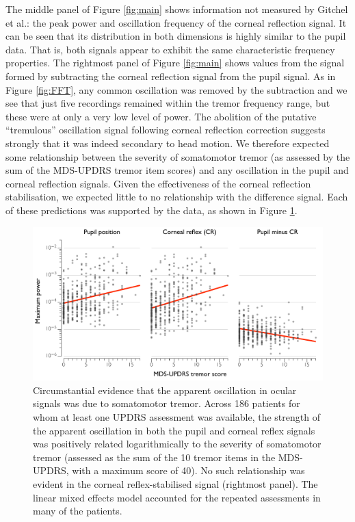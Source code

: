 \documentclass[jou,a4paper]{apa6}
\begin{document}
The middle panel of Figure \ref{fig:main} shows information not measured by Gitchel et al.: the peak power and oscillation frequency of the corneal reflection signal. It can be seen that its distribution in both dimensions is highly similar to the pupil data. That is, both signals appear to exhibit the same characteristic frequency properties. The rightmost panel of Figure \ref{fig:main} shows values from the signal formed by subtracting the corneal reflection signal from the pupil signal. As in Figure \ref{fig:FFT}, any common oscillation was removed by the subtraction and we see that just five recordings remained within the tremor frequency range, but these were at only a very low level of power.
The abolition of the putative ``tremulous'' oscillation signal following corneal reflection correction suggests strongly that it was indeed secondary to head motion. We therefore expected some relationship between the severity of somatomotor tremor (as assessed by the sum of the MDS-UPDRS tremor item scores) and any oscillation in the pupil and corneal reflection signals. Given the effectiveness of the corneal reflection stabilisation, we expected little to no relationship with the difference signal. Each of these predictions was supported by the data, as shown in Figure \ref{fig:UPDRS}.

\begin{figure}[htbp]
\begin{center}
\includegraphics {Figures/Figure_5_UPDRS_correlation}
\caption{Circumstantial evidence that the apparent oscillation in ocular signals was due to somatomotor tremor. Across 186 patients for whom at least one UPDRS assessment was available, the strength of the apparent oscillation in both the pupil and corneal reflex signals was positively related logarithmically to the severity of somatomotor tremor (assessed as the sum of the 10 tremor items in the MDS-UPDRS, with a maximum score of 40). No such relationship was evident in the corneal reflex-stabilised signal (rightmost panel). The linear mixed effects model accounted for the repeated assessments in many of the patients.
}
\label{fig:UPDRS}
\end{center}
\end{figure}
\end{document}
